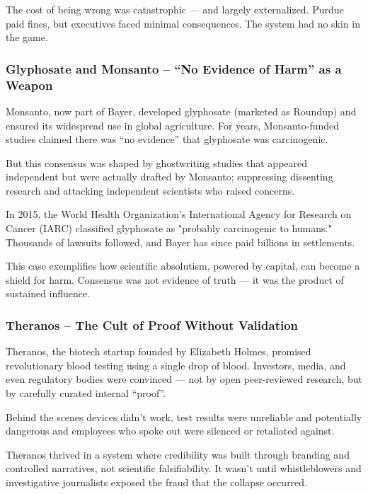 The cost of being wrong was catastrophic — and largely externalized. Purdue paid fines, but executives faced minimal consequences. The system had no skin in the game.

\cite{CBSnewsPurduePharma}
\cite{PBSPurduePharma}
\cite{Alonso2021}

\subsubsection{Glyphosate and Monsanto – “No Evidence of Harm” as a Weapon}

Monsanto, now part of Bayer, developed glyphosate (marketed as Roundup) and ensured its widespread use in global agriculture. For years, Monsanto-funded studies claimed there was “no evidence” that glyphosate was carcinogenic.

But this consensus was shaped by ghostwriting studies that appeared independent but were actually drafted by Monsanto; suppressing dissenting research and attacking independent scientists who raised concerns.

In 2015, the World Health Organization’s International Agency for Research on Cancer (IARC) classified glyphosate as "probably carcinogenic to humans." Thousands of lawsuits followed, and Bayer has since 
paid billions in settlements.

This case exemplifies how scientific absolutism, powered by capital, can become a shield for harm. Consensus was not evidence of truth — it was the product of sustained influence.

\cite{GLENNA2021104290}
\cite{mindthegap2020}
\cite{ehn2018}

\subsubsection{Theranos – The Cult of Proof Without Validation}

Theranos, the biotech startup founded by Elizabeth Holmes, promised revolutionary blood testing using a
single drop of blood. Investors, media, and even regulatory bodies were convinced — not by open
peer-reviewed research, but by carefully curated internal “proof”.

Behind the scenes devices didn't work, test results were unreliable and potentially dangerous and employees who spoke out were silenced or retaliated against.

Theranos thrived in a system where credibility was built through branding and controlled narratives, not 
scientific falsifiability. It wasn't until whistleblowers and investigative journalists exposed the fraud
that the collapse occurred.

